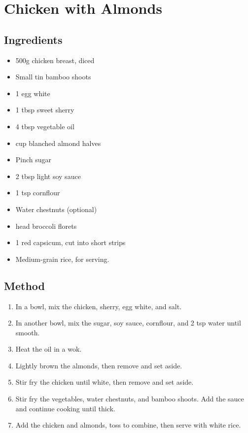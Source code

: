 \clearpage
\section{Chicken with Almonds}


\subsection{Ingredients}

\begin{itemize}
    \item 500g chicken breast, diced
    \item Small tin bamboo shoots
    \item 1 egg white
    \item 1 tbsp sweet sherry
    \item 4 tbsp vegetable oil
    \item {} cup blanched almond halves
    \item Pinch sugar
    \item 2 tbsp light soy sauce
    \item 1 tsp cornflour
    \item Water chestnuts (optional)
    \item {} head broccoli florets
    \item 1 red capsicum, cut into short strips
    \item Medium-grain rice, for serving.
\end{itemize}

\subsection{Method}

\begin{enumerate}
    \item In a bowl, mix the chicken, sherry, egg white, and salt.
    \item In another bowl, mix the sugar, soy sauce, cornflour, and 2 tsp water until smooth.
    \item Heat the oil in a wok.
    \item Lightly brown the almonds, then remove and set aside.
    \item Stir fry the chicken until white, then remove and set aside.
    \item Stir fry the vegetables, water chestnuts, and bamboo shoots. Add the sauce and continue cooking until thick.
    \item Add the chicken and almonds, toss to combine, then serve with white rice.
\end{enumerate}
